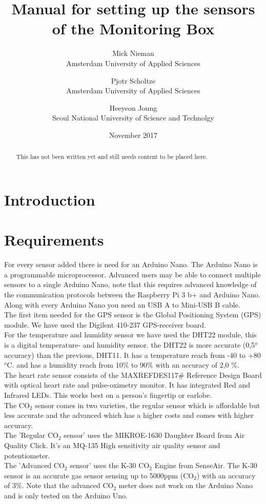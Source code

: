 \documentclass{report}
\title{Manual for setting up the sensors of the Monitoring Box}
\author{Mick Nieman \\ Amsterdam University of Applied Sciences \and Pjotr Scholtze \\ Amsterdam University of Applied Sciences \and Heeyeon Joung \\ Seoul National University of Science and Technolgy}
\date{November 2017}
\begin{document}
\maketitle
\begin{abstract}
This has not been written yet and still needs content to be placed here. 
\end{abstract}

\tableofcontents

\chapter{Introduction}

\chapter{Requirements}
For every sensor added there is need for an Arduino Nano. The Arduino Nano is a programmable microprocessor. Advanced users may be able to connect multiple sensors to a single Arduino Nano, note that this requires advanced knowledge of the communication protocols between the Raspberry Pi 3 b+ and Arduino Nano. Along with every Arduino Nano you need an USB A to Mini-USB B cable.  \\

The first item needed for the GPS sensor is the Global Positioning System (GPS) module. We have used the Digilent 410-237 GPS-receiver board. \\

For the temperature and humidity sensor we have used the DHT22 module, this is a digital temperature- and humidity sensor. the DHT22 is more accurate (0,5$^o$ accuracy) than the previous, DHT11. It has a temperature reach from -40 to +80 $^o$C. and has a humidity reach from 10\% to 90\% with an accuracy of 2,0 \%.  \\

The heart rate sensor consists of the MAXREFDES117\# Reference Design Board with optical heart rate and pulse-oximetry monitor. It has integrated Red and Infrared LEDs. This works best on a person's fingertip or earlobe. \\

The CO$_2$ sensor comes in two varieties, the regular sensor which is affordable but less accurate and the advanced which has a higher costs and comes with higher accuracy. \\
The 'Regular CO$_2$ sensor' uses the MIKROE-1630 Daughter Board from Air Quality Click. It's an MQ-135 High sensitivity air quality sensor and potentiometer. \\
The 'Advanced CO$_2$ sensor' uses the K-30 CO$_2$ Engine from SenseAir. The K-30 sensor is an accurate gas sensor sensing up to 5000ppm (CO$_2$) with an accuracy of 3\%. Note that the advanced CO$_2$ meter does not work on the Arduino Nano and is only tested on the Arduino Uno. \\
\end{document}
